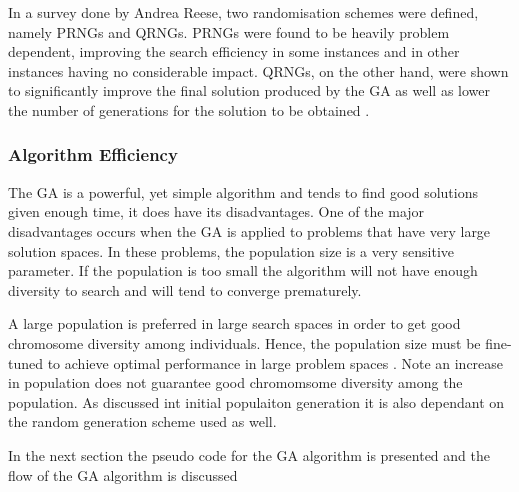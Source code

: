 In a survey done by Andrea Reese\cite{RandomNumberGA}, two randomisation schemes were defined, namely  \glspl{PRNG} and \glspl{QRNG}. \glspl{PRNG} were found to be heavily problem dependent, improving the search efficiency in some instances and in other instances having no considerable impact. QRNGs, on the other hand, were shown to significantly improve the final solution produced by the \gls{GA} as well as lower the number of generations for the solution to be obtained \cite{RandomNumberGA}.

\subsubsection{Algorithm Efficiency}
The \gls{GA} is a powerful, yet simple algorithm and tends to find good solutions given enough time, it does have its disadvantages. One of the major disadvantages occurs when the \gls{GA} is applied to problems that have very large solution spaces. In these problems, the population size is a very sensitive parameter\cite{AdaptiveSAGA,HetergeneousGA,SelfAdaptiveDataMiningGA,PatternDetectionGA}. If the population is too small the algorithm will not have enough diversity to search and will tend to converge prematurely. 

A large population is preferred in large search spaces in order to get good chromosome diversity among individuals. Hence, the population size must be fine-tuned to achieve optimal performance in large problem spaces \cite{AdaptiveSAGA,CompuIntelligenceIntro}. Note an increase in population does not guarantee good chromomsome diversity among the population. As discussed int initial populaiton generation it is also dependant on the random generation scheme used as well. 


In the next section the pseudo code for the \gls{GA} algorithm is presented and the flow of the \gls{GA} algorithm is discussed
